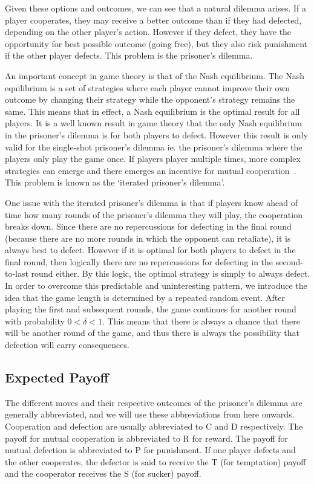 \documentclass[a4paper,12pt]{article}
\begin{document}
Given these options and outcomes, we can see that a natural dilemma arises.
If a player cooperates, they may receive a better outcome than if they had defected, depending on the other player's action.
However if they defect, they have the opportunity for best possible outcome (going free), but they also risk punishment if the other player defects.
This problem is the prisoner's dilemma.

An important concept in game theory is that of the Nash equilibrium.
The Nash equilibrium is a set of strategies where each player cannot improve their own outcome by changing their strategy while the opponent's strategy remains the same.
This means that in effect, a Nash equilibrium is the optimal result for all players.
It is a well known result in game theory that the only Nash equilibrium in the prisoner's dilemma is for both players to defect.
However this result is only valid for the single-shot prisoner's dilemma ie. the prisoner's dilemma where the players only play the game once.
If players player multiple times, more complex strategies can emerge and there emerges an incentive for mutual cooperation~\cite{trivers}.
This problem is known as the `iterated prisoner's dilemma'.

One issue with the iterated prisoner's dilemma is that if players know ahead of time how many rounds of the prisoner's dilemma they will play, the cooperation breaks down.
Since there are no repercussions for defecting in the final round (because there are no more rounds in which the opponent can retaliate), it is always best to defect.
However if it is optimal for both players to defect in the final round, then logically there are no repercussions for defecting in the second-to-last round either.
By this logic, the optimal strategy is simply to always defect.
In order to overcome this predictable and uninteresting pattern, we introduce the idea that the game length is determined by a repeated random event.
After playing the first and subsequent rounds, the game continues for another round with probability $0 < \delta < 1$.
This means that there is always a chance that there will be another round of the game, and thus there is always the possibility that defection will carry consequences.

\subsection{Expected Payoff}

The different moves and their respective outcomes of the prisoner's dilemma are generally abbreviated, and we will use these abbreviations from here onwards.
Cooperation and defection are usually abbreviated to C and D respectively.
The payoff for mutual cooperation is abbreviated to R for reward.
The payoff for mutual defection is abbreviated to P for punishment.
If one player defects and the other cooperates, the defector is said to receive the T (for temptation) payoff and the cooperator receives the S (for sucker) payoff.
\end{document}
